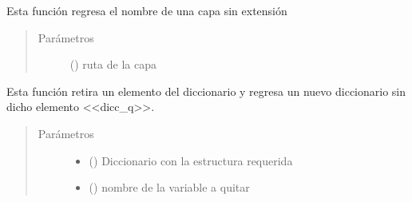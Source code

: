 \documentclass[letterpaper,10pt,spanish]{sphinxmanual}
\begin{document}

\begin{fulllineitems}
\label{\detokenize{analisis:sensibilidad_por_remocion_capas.nombre_capa}}
Esta función regresa el nombre de una capa sin extensión
\begin{quote}\begin{description}
\item[{Parámetros}] \leavevmode
{} () \textendash{} ruta de la capa

\end{description}\end{quote}

\end{fulllineitems}


\begin{fulllineitems}
\label{\detokenize{analisis:sensibilidad_por_remocion_capas.quita}}
Esta función retira un elemento del diccionario y regresa un nuevo diccionario
sin dicho elemento \textless{}\textless{}dicc\_q\textgreater{}\textgreater{}.
\begin{quote}\begin{description}
\item[{Parámetros}] \leavevmode\begin{itemize}
\item {} 
 () \textendash{} Diccionario con la estructura requerida

\item {} 
 () \textendash{} nombre de la variable a quitar

\end{itemize}

\end{description}\end{quote}

\end{fulllineitems}
\end{document}
